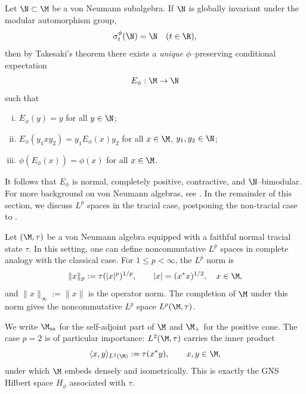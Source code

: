 \documentclass[sn-mathphys-num]{sn-jnl}
\begin{document}
Let $\N \subset \M$ be a von Neumann subalgebra. If $\N$ is globally invariant under the modular automorphism group,
\[
  \sigma_t^\phi(\N)=\N \quad (t\in\R),
\]
then by Takesaki's theorem \cite{Takesaki_1972,takesaki_theory_2003-2} there exists a \emph{unique} {$\phi$--preserving conditional expectation}
\[
  E_\phi : \M \to \N
\]
such that
\begin{enumerate}[(i)]
  \item $E_\phi(y) = y$ for all $y \in \N$;
  \item $E_\phi(y_1 x y_2) = y_1 E_\phi(x) y_2$ for all $x \in \M$, $y_1,y_2 \in \N$;
  \item $\phi(E_\phi(x)) = \phi(x)$ for all $x \in \M$.
\end{enumerate}
It follows that $E_\phi$ is normal, completely positive, contractive, and $\N$--bimodular.
For more background on von Neumann algebras, see \cite{Takesaki_1979,takesaki_theory_2003-2}. In the remainder of this section, we discuss $L^p$ spaces in the tracial case, postponing the non-tracial case to .

Let $(\M,\tau)$ be a von Neumann algebra equipped with a faithful normal tracial state $\tau$.
In this setting, one can define noncommutative $L^p$ spaces in complete analogy with the classical case.
For $1\le p<\infty$, the $L^p$ norm is
\[
  \|x\|_p := \tau(|x|^p)^{1/p},
  \qquad |x|=(x^*x)^{1/2}, \quad x\in\M,
\]
and $\|x\|_\infty := \|x\|$ is the operator norm.
The completion of $\M$ under this norm gives the noncommutative $L^p$ space $L^p(\M,\tau)$.

We write $\M_{\mathrm{sa}}$ for the self-adjoint part of $\M$ and $\M_+$ for the positive cone.
The case $p=2$ is of particular importance: $L^2(\M,\tau)$ carries the inner product
\[
  \langle x,y\rangle_{L^2(\M)} := \tau(x^*y), \qquad x,y\in\M,
\]
under which $\M$ embeds densely and isometrically.
This is exactly the GNS Hilbert space $H_\phi$ associated with $\tau$.
\end{document}
